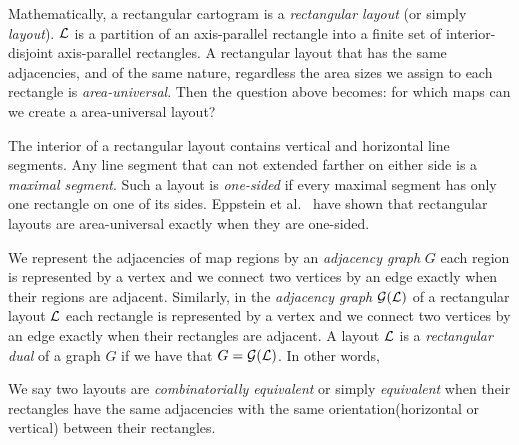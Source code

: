 %

  Mathematically, a rectangular cartogram is a  \emph{rectangular layout} (or simply \emph{layout}). $\mathcal{L}$ is a partition of an axis-parallel rectangle into a finite set of interior-disjoint axis-parallel rectangles.
  A rectangular layout that has the same adjacencies, and of the same nature, regardless the area sizes we assign to each rectangle is \emph{area-universal}.
  Then the question above becomes: for which maps can we create a area-universal layout?

  The interior of a rectangular layout contains vertical and horizontal line segments.
  Any line segment that can not extended farther on either side is a \emph{maximal segment}.
  Such a layout is \emph{one-sided} if every maximal segment has only one rectangle on one of its sides.
  Eppstein et al.~\cite{Eppstein2012} have shown that rectangular layouts are area-universal exactly when they are one-sided.

  We represent the adjacencies of map regions by an \emph{ adjacency graph} $G$ each region is represented by a vertex and we connect two vertices by an edge exactly when their regions are adjacent.
  Similarly, in the \emph{ adjacency graph} $\mathcal{G}(\mathcal{L})$ of a rectangular layout $\mathcal{L}$ each rectangle is represented by a vertex and we connect two vertices by an edge exactly when their rectangles are adjacent.
  A layout $\mathcal{L}$ is a \emph{rectangular dual} of a graph $G$ if we have that $G = \mathcal{G}(\mathcal{L})$.
  In other words,

  We say two layouts are  \emph{combinatorially equivalent} or simply \emph{equivalent} when their rectangles have the same adjacencies with the same orientation(horizontal or vertical) between their rectangles. 


